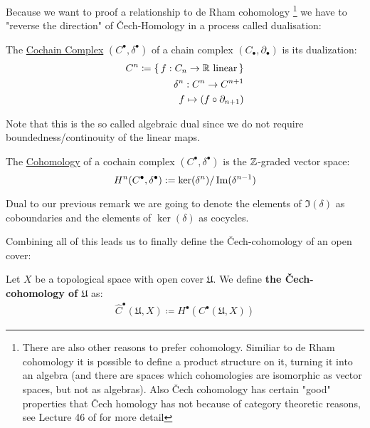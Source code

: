 Because we want to proof a relationship to de Rham cohomology \footnote{
	There are also other reasons to prefer cohomology. Similiar to de Rham
	cohomology it is possible to define a product structure on it, turning
	it into an algebra (and
	there are spaces which cohomologies are isomorphic as vector spaces,
	but not as algebras). Also Čech cohomology has certain "good" properties
	that Čech homology has not because of category theoretic reasons, see
	Lecture 46 of \cite{wendl_topology_2024} for more detail
 }
we have to "reverse the direction" of Čech-Homology in a process called
dualisation:
\begin{definition}
The \underline{Cochain Complex} $(C^\bullet, \delta^\bullet)$ of a 
chain complex $(C_\bullet, \partial_\bullet)$ is its dualization:
\begin{align}
	C^n \coloneq \{\, f: C_n \to \mathbb{R} \text{ linear}  \,\}\\
	\delta^n: C^n \to C^{n + 1} \\
	f \mapsto (f \circ \partial_{n + 1})
\end{align}
\end{definition}
\begin{remark}
Note that this is the so called algebraic dual since we do not require
boundedness/continouity of the linear maps.
\end{remark}
\begin{definition}
The \underline{Cohomology} of a cochain complex
$(C^\bullet, \delta^\bullet)$ is the $\mathbb{Z}$-graded vector space:
\[
	H^n(C^\bullet, \delta^\bullet) := \ker(\delta^n)/\operatorname{Im}(\delta^{n - 1})
\]
\end{definition}
Dual to our previous remark we are going to denote the elements of $\Im(\delta)$ as coboundaries
and the elements of $\ker(\delta)$ as cocycles.

Combining all of this leads us to finally define the Čech-cohomology of an open cover:
\begin{definition}
Let $X$ be a topological space with open cover $\mathfrak{U}$. We define \textbf{the Čech-cohomology of
$\mathfrak{U}$} as:
\begin{align*}
	\hat{C}^\bullet(\mathfrak{U}, X) \coloneqq H^\bullet(C^\bullet(\mathfrak{U}, X))
\end{align*}
\end{definition}


